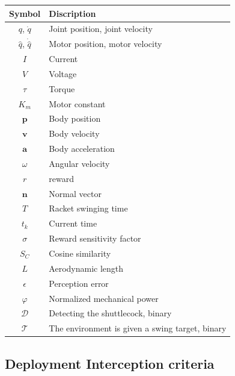 \documentclass[9pt,twocolumn,twoside]{osajnl}
\begin{document}
\begin{table}[h!]
\centering
\begin{tabular}{cl}
\rowcolor[HTML]{EFEFEF} 
\textbf{Symbol} & \textbf{Discription}           \\ \hline
$q$, $\Dot{q}$               & Joint position, joint velocity \\
$\hat{q}$, $\Dot{\hat{q}}$               & Motor position, motor velocity \\
$I$               & Current \\
$V$               &  Voltage \\
$\tau$               &  Torque \\
$K_m$               &  Motor constant \\
$\mathbf{p}$               & Body position                  \\
$\mathbf{v}$               & Body velocity                  \\
$\mathbf{a}$               & Body acceleration              \\
$\omega$               & Angular velocity              \\
$r$               & reward                         \\
$\mathbf{n}$                & Normal vector                  \\
$T$              & Racket swinging time           \\
$t_k$               & Current time                   \\
$\sigma$                & Reward sensitivity factor      \\
$S_C$                & Cosine similarity                \\
$L$                & Aerodynamic length          \\
$\epsilon$                & Perception error          \\
$\varphi$                & Normalized mechanical power          \\
$\mathcal{D}$                & Detecting the shuttlecock, binary          \\
$\mathcal{T}$                & The environment is given a swing target, binary  
\end{tabular}
\end{table}


\subsection*{Deployment Interception criteria}
\end{document}
